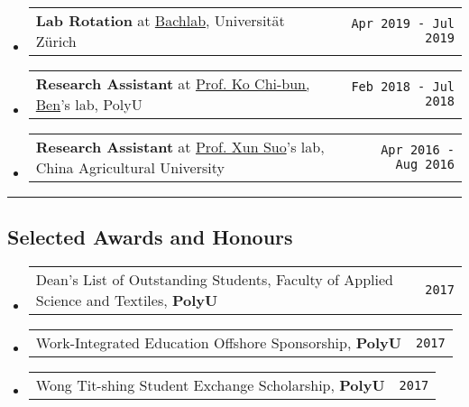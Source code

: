 \documentclass[10pt,a4paper]{article}
\makeatletter
\newcommand{\headerrow}[2]
{\begin{tabular*}{\linewidth}{l@{\extracolsep{\fill}}r}
	#1 &
	#2 \\
\end{tabular*}}
\newcommand{\urlKo}{https://www.polyu.edu.hk/en/abct/people/academic-staff/dr-ko-cb-ben/}
\newcommand{\urlSuo}{https://cvm.cau.edu.cn/art/2017/9/8/art_41955_48.html}
\newcommand{\Bachlab}{\href{http://bachlab.org/}{Bachlab}}
\newcommand{\CongiBench}{\href{https://github.com/fmelinscak/cognibench}{CongiBench}}
\newcommand{\SciUnit}{\href{https://github.com/scidash/sciunit}{SciUnit}}
\makeatother
\begin{document}
\begin{itemize}
	\item
	      \headerrow
	      {\textbf{Lab Rotation} at \Bachlab, Universität Zürich}
	      {\texttt{Apr 2019 - Jul 2019}}

	\item
	      \headerrow
	      {\textbf{Research Assistant} at \href{\urlKo}{Prof. Ko Chi-bun, Ben}'s lab, PolyU}
	      {\texttt{Feb 2018 - Jul 2018}}

	\item
	      \headerrow
	      {\textbf{Research Assistant} at \href{\urlSuo}{Prof. Xun Suo}'s lab,
		      China Agricultural University}
	      {\texttt{Apr 2016 - Aug 2016}}

\end{itemize}



\hrule
\vspace{-1em}
\subsection*{Selected Awards and Honours}

\begin{itemize}
	\parskip=0.1em
	\item
	      \headerrow
	      {Dean’s List of Outstanding Students, Faculty of Applied Science and
		      Textiles, \textbf{PolyU}}
	      {\texttt{{2017}}}

	\item
	      \headerrow
	      {Work-Integrated Education Offshore Sponsorship, \textbf{PolyU}}
	      {\texttt{{2017}}}

	\item
	      \headerrow
	      {Wong Tit-shing Student Exchange Scholarship, \textbf{PolyU}}
	      {\texttt{{2017}}}

\end{itemize}
\end{document}
